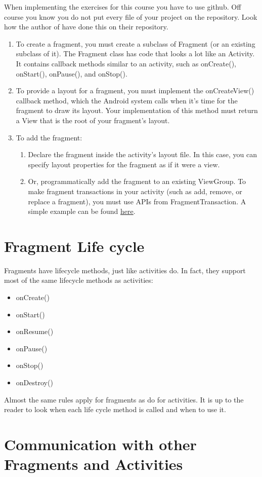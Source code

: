\begin{framed}
	When implementing the exercises for this course you have to use github. Off course you know you do not put every file of your project on the repository. Look how the author of \cite{murphymarkl.2017} have done this on their repository. 
\end{framed}
\begin{enumerate}
	\item To create a fragment, you must create a subclass of Fragment (or an existing subclass of it). The Fragment class has code that looks a lot like an Activity. It contains callback methods similar to an activity, such as onCreate(), onStart(), onPause(), and onStop().
	\item To provide a layout for a fragment, you must implement the onCreateView() callback method, which the Android system calls when it's time for the fragment to draw its layout. Your implementation of this method must return a View that is the root of your fragment's layout.
	\item To add the fragment:
	\begin{enumerate}
		\item  Declare the fragment inside the activity's layout file.
		In this case, you can specify layout properties for the fragment as if it were a view. 
		\item Or, programmatically add the fragment to an existing ViewGroup. To make fragment transactions in your activity (such as add, remove, or replace a fragment), you must use APIs from FragmentTransaction. A simple example can be found \href{https://github.com/commonsguy/cw-omnibus/tree/master/Fragments/Dynamic}{here}.
	\end{enumerate}
\end{enumerate}

\section{Fragment Life cycle}
Fragments have lifecycle methods, just like activities do. In fact, they support most
of the same lifecycle methods as activities:
\begin{itemize}
	\item onCreate()
	\item onStart() 
	\item onResume()
	\item onPause()
	\item onStop()
	\item onDestroy()
\end{itemize}
Almost the same rules apply for fragments as do for activities. It is up to the reader to look when each life cycle method is called and when to use it. 

\section{Communication with other Fragments and Activities}



